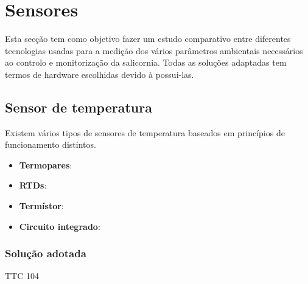 \newpage
\section{Sensores}


Esta secção tem como objetivo fazer um estudo comparativo entre diferentes tecnologias usadas para a medição dos vários parâmetros ambientais necessários ao controlo e monitorização da salicornia. Todas as soluções adaptadas tem termos de hardware escolhidas devido à possui-las. 

\subsection{Sensor de temperatura }
Existem vários tipos de sensores de temperatura baseados em princípios de funcionamento distintos. 


\begin{itemize}
	\item \textbf{Termopares}: 
	\item \textbf{RTDs}:
	\item \textbf{Termístor}: 
	\item \textbf{Circuito integrado}: 
\end{itemize}




\subsubsection{Solução adotada}


TTC 104

